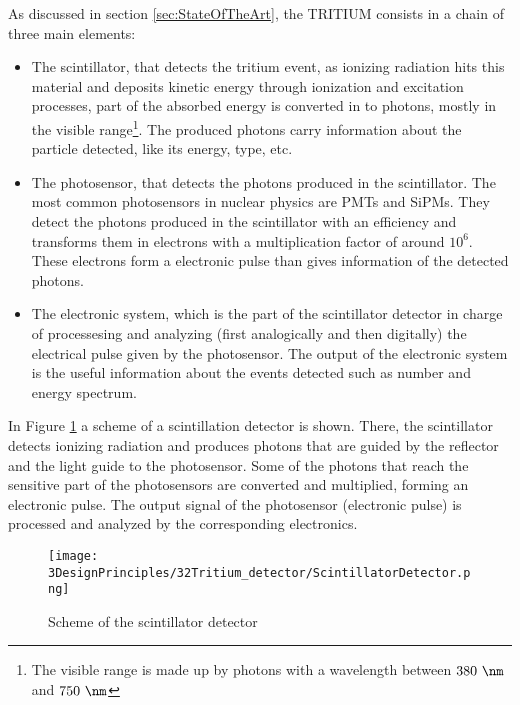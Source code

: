 As discussed in section \ref{sec:StateOfTheArt}, the TRITIUM consists in a chain of three main elements:

\begin{itemize}

\item{} The scintillator, that detects the tritium event, as ionizing radiation hits this material and deposits kinetic energy through ionization and excitation processes, part of the absorbed energy is converted in to photons, mostly in the visible range\footnote{The visible range is made up by photons with a wavelength between $380~\nm$ and $750~\nm$}. The produced photons carry information about the particle detected, like its energy, type, etc.

\item{} The photosensor, that detects the photons produced in the scintillator. The most common photosensors in nuclear physics are PMTs and SiPMs. They detect the photons produced in the scintillator with an efficiency and transforms them in electrons with a multiplication factor of around $10^6$. These electrons form a electronic pulse than gives information of the detected photons.

\item{} The electronic system, which is the part of the scintillator detector in charge of processesing and analyzing (first analogically and then digitally) the electrical pulse given by the photosensor. The output of the electronic system is the useful information about the events detected such as number and energy spectrum.

\end{itemize}

In Figure \ref{fig:ScintillatorDetector} a scheme of a scintillation detector is shown. There, the scintillator detects ionizing radiation and produces photons that are guided by the reflector and the light guide to the photosensor. Some of the photons that reach the sensitive part of the photosensors are converted and multiplied, forming an electronic pulse. The output signal of the photosensor (electronic pulse) is processed and analyzed by the corresponding electronics.

\begin{figure}[hbtp]
\texttt{[image: 3DesignPrinciples/32Tritium\_detector/ScintillatorDetector.png]}
\centering
\caption{Scheme of the scintillator detector\label{fig:ScintillatorDetector}}
\end{figure}
